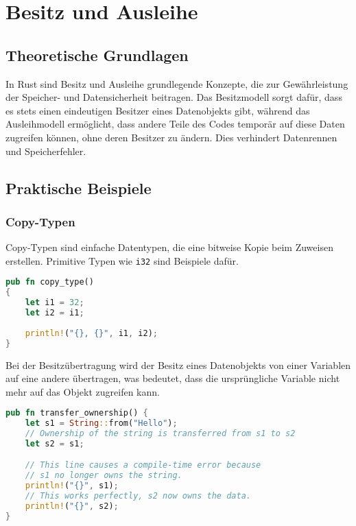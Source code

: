 \chapter{Besitz und Ausleihe}

\section{Theoretische Grundlagen}

In Rust sind Besitz und Ausleihe grundlegende Konzepte, die zur Gewährleistung der Speicher- und Datensicherheit beitragen. Das Besitzmodell sorgt dafür, dass es stets einen eindeutigen Besitzer eines Datenobjekts gibt, während das Ausleihmodell ermöglicht, dass andere Teile des Codes temporär auf diese Daten zugreifen können, ohne deren Besitzer zu ändern. Dies verhindert Datenrennen und Speicherfehler.

\section{Praktische Beispiele}

\subsection{Copy-Typen}
Copy-Typen sind einfache Datentypen, die eine bitweise Kopie beim Zuweisen erstellen. Primitive Typen wie \texttt{i32} sind Beispiele dafür.

\begin{lstlisting}[language=Rust, caption=Copy-Typen Beispiel]
pub fn copy_type() 
{
    let i1 = 32;
    let i2 = i1;
    
    println!("{}, {}", i1, i2);
}
\end{lstlisting}
\noindent
Bei der Besitzübertragung wird der Besitz eines Datenobjekts von einer Variablen auf eine andere übertragen, was bedeutet, dass die ursprüngliche Variable nicht mehr auf das Objekt zugreifen kann.

\begin{lstlisting}[language=Rust, caption=Unveränderliche Ausleihe Beispiel]
pub fn transfer_ownership() {
    let s1 = String::from("Hello");
    // Ownership of the string is transferred from s1 to s2
    let s2 = s1;  

    // This line causes a compile-time error because 
    // s1 no longer owns the string.
    println!("{}", s1); 
    // This works perfectly, s2 now owns the data.
    println!("{}", s2); 
}
\end{lstlisting}
\cleardoublepage
